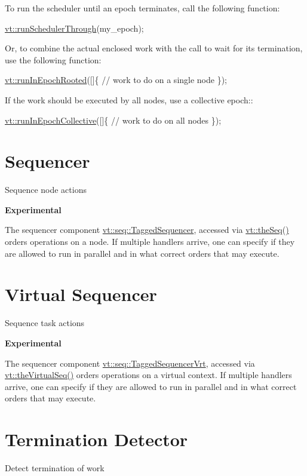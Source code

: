 To run the scheduler until an epoch terminates, call the following function\+:


\begin{DoxyCode}
\hyperlink{namespacevt_aa550774c1c9c668176ce535fd7d58fb0}{vt::runSchedulerThrough}(my\_epoch);
\end{DoxyCode}


Or, to combine the actual enclosed work with the call to wait for its termination, use the following function\+:


\begin{DoxyCode}
\hyperlink{namespacevt_ad419c00d2e4ac8601ea3b1dec633f3f7}{vt::runInEpochRooted}([]\{
  \textcolor{comment}{// work to do on a single node}
\});
\end{DoxyCode}


If the work should be executed by all nodes, use a collective epoch\+:\+:


\begin{DoxyCode}
\hyperlink{namespacevt_a291cca514e6f66292df339cd92a54502}{vt::runInEpochCollective}([]\{
  \textcolor{comment}{// work to do on all nodes}
\});
\end{DoxyCode}
 \hypertarget{seq}{}\section{Sequencer}\label{seq}
Sequence node actions

 {\bfseries Experimental}

The sequencer component {\ttfamily \hyperlink{structvt_1_1seq_1_1_tagged_sequencer}{vt\+::seq\+::\+Tagged\+Sequencer}}, accessed via {\ttfamily \hyperlink{namespacevt_a4a7d07c845b311da59286de486d623c7}{vt\+::the\+Seq()}} orders operations on a node. If multiple handlers arrive, one can specify if they are allowed to run in parallel and in what correct orders that may execute. \hypertarget{vrtseq}{}\section{Virtual Sequencer}\label{vrtseq}
Sequence task actions

 {\bfseries Experimental}

The sequencer component {\ttfamily \hyperlink{structvt_1_1seq_1_1_tagged_sequencer_vrt}{vt\+::seq\+::\+Tagged\+Sequencer\+Vrt}}, accessed via {\ttfamily \hyperlink{namespacevt_abdbb9ddb0d79b35c89e9d742d3fc9d42}{vt\+::the\+Virtual\+Seq()}} orders operations on a virtual context. If multiple handlers arrive, one can specify if they are allowed to run in parallel and in what correct orders that may execute. \hypertarget{term}{}\section{Termination Detector}\label{term}
Detect termination of work

